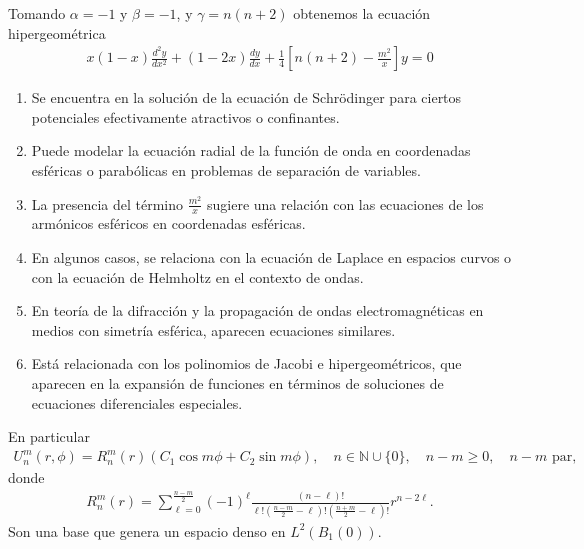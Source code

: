 \documentclass{beamer}
\begin{document}
\begin{frame}
  Tomando $\alpha=-1$ y $\beta=-1$, y $\gamma=n(n+2)$ obtenemos la ecuación hipergeométrica
  \begin{align*}
    x(1-x)\frac{d^2y}{dx^2}+(1-2x)\frac{dy}{dx}+\frac{1}{4}\left[ n(n+2)-\frac{m^2}{x} \right]y=0
  \end{align*}
\end{frame}

\begin{frame}
  \begin{enumerate}
  \item Se encuentra en la solución de la ecuación de Schrödinger para ciertos potenciales efectivamente atractivos o confinantes.
  \item Puede modelar la ecuación radial de la función de onda en coordenadas esféricas o parabólicas en problemas de separación de variables.
  \item La presencia del término $\frac{m^2}{x}$ sugiere una relación con las ecuaciones de los armónicos esféricos en coordenadas esféricas.
  \item En algunos casos, se relaciona con la ecuación de Laplace en espacios curvos o con la ecuación de Helmholtz en el contexto de ondas.
  \item En teoría de la difracción y la propagación de ondas electromagnéticas en medios con simetría esférica, aparecen ecuaciones similares.
  \item Está relacionada con los polinomios de Jacobi e hipergeométricos, que aparecen en la expansión de funciones en términos de soluciones de ecuaciones diferenciales especiales.
  \end{enumerate}
\end{frame}

\begin{frame}
  En particular
  \begin{align*}
    U_n^m (r,\phi) = R_n^m (r) (C_1 \cos m\phi + C_2 \sin m\phi), \quad n \in \mathbb{N} \cup \{0\}, \quad n - m \geq 0, \quad n - m \text{ par},
  \end{align*}
  donde
  \begin{align*}
    R_n^m (r) = \sum_{\ell=0}^{\frac{n-m}{2}} (-1)^\ell \frac{(n - \ell)!}{\ell! ( \frac{n-m}{2} - \ell)! ( \frac{n+m}{2} - \ell)!} r^{n-2\ell}.
  \end{align*}
  Son una base que genera un espacio denso en $L^2(B_{1}(0))$.
\end{frame}
\end{document}
